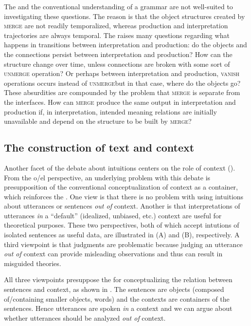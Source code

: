  The  and the conventional understanding of a grammar are not well-suited to investigating these questions. The reason is that the object structures created by \textsc{merge} are not readily temporalized, whereas production and interpretation trajectories are always temporal. The  raises many questions regarding what happens in transitions between interpretation and production: do the objects and the connections persist between interpretation and production? How can the structure change over time, unless connections are broken with some sort of \textsc{unmerge} operation? Or perhaps between interpretation and production, \textsc{vanish} operations occurs instead of \textsc{unmerge}{\textemdash}but in that case, where do the objects go? These absurdities are compounded by the problem that \textsc{merge} is separate from the  interfaces. How can \textsc{merge} produce the same output in interpretation and production if, in interpretation, intended meaning relations are initially unavailable and depend on the structure to be built by \textsc{merge?} 

\subsection{The construction of text and context}

Another facet of the debate about  intuitions centers on the role of context (\citealt{Bolinger1965,Keller2000,Schütze2016}). From the o/el perspective, an underlying problem with this debate is presupposition of the conventional conceptualization of context as a container, which reinforces the . One view is that there is no problem with using intuitions about utterances or sentences \textit{out of} context. Another is that interpretations of utterances \textit{in} a “default” (idealized, unbiased, etc.) context are useful for theoretical purposes. These two perspectives, both of which accept  intutions of isolated sentences as useful data, are illustrated in {}(A) and (B), respectively. A third viewpoint is that  judgments are problematic because judging an utterance \textit{out of} context can provide misleading observations and thus can result in misguided theories.

  All three viewpoints presuppose the  for conceptualizing the relation between sentences and context, as shown in {}. The sentences are objects (composed of/containing smaller objects, words) and the contexts are containers of the sentences. Hence utterances are spoken \textit{in} a context and we can argue about whether utterances should be analyzed \textit{out of} context.   


